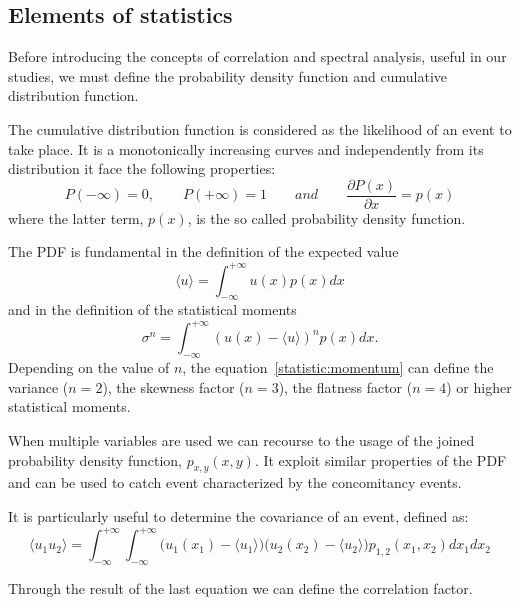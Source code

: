 \subsection{Elements of statistics}
Before introducing the concepts of correlation and spectral analysis, useful in our studies, we must define the probability density function and cumulative distribution function. \par
The cumulative distribution function is considered as the likelihood of an event to take place. It is a monotonically increasing curves and independently from its distribution it face the following properties:
\begin{equation*}
P(-\infty) = 0, \qquad P(+\infty) = 1 \qquad and \qquad \frac{\partial P(x)}{\partial x} = p(x)
\end{equation*}
where the latter term, $p(x)$, is the so called probability density function.
\par
The PDF is fundamental in the definition of the expected value
\begin{equation}
\langle u \rangle = \int_{-\infty}^{+\infty} u(x) p(x) dx
\end{equation}
and in the definition of the statistical moments
\begin{equation}
\sigma^{n} = \int_{-\infty}^{+\infty} (u(x) - \langle u \rangle)^{n} p(x)dx.
\label{statistic:momentum}
\end{equation}
Depending on the value of $n$, the equation~\ref{statistic:momentum} can define the variance ($n=2$), the skewness factor ($n=3$), the flatness factor ($n=4$) or higher statistical moments.
\par
When multiple variables are used we can recourse to the usage of the joined probability density function, $p_{x,y}(x,y)$. It exploit similar properties of the PDF and can be used to catch event characterized by the concomitancy events. 
\par
It is particularly useful to determine the covariance of an event, defined as:
\begin{equation*}
\langle u_{1}u_{2} \rangle = \int_{-\infty}^{+\infty} \int_{-\infty}^{+\infty} \big( u_{1}(x_{1}) - \langle u_{1} \rangle \big) \big( u_{2}(x_{2}) - \langle u_{2} \rangle \big) p_{1,2}(x_{1},x_{2}) dx_{1} dx_{2}
\end{equation*}
\par
Through the result of the last equation we can define the correlation factor.




